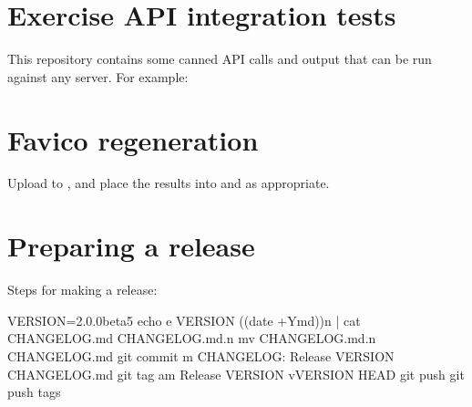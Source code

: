 \documentclass[letterpaper,10pt,english]{sphinxmanual}
\begin{document}
\section{Exercise API integration tests}
\label{\detokenize{advanced/development:exercise-api-integration-tests}}
\sphinxAtStartPar
This repository contains some canned API calls and output that can be run against
any server. For example:

\begin{sphinxVerbatim}[commandchars=\\\{\}]
  
\end{sphinxVerbatim}


\section{Favico regeneration}
\label{\detokenize{advanced/development:favico-regeneration}}
\sphinxAtStartPar
Upload  to , and place the results into
 and  as appropriate.


\section{Preparing a release}
\label{\detokenize{advanced/development:preparing-a-release}}
\sphinxAtStartPar
Steps for making a release:

\begin{sphinxVerbatim}[commandchars=\\\{\}]
VERSION=\PYGZdq{}2.0.0\PYGZhy{}beta5\PYGZdq{}
echo \PYGZhy{}e \PYGZdq{}\PYGZsh{}\PYGZsh{} \PYGZdl{}\PYGZob{}VERSION\PYGZcb{} (\PYGZdl{}(date +\PYGZsq{}\PYGZpc{}Y\PYGZhy{}\PYGZpc{}m\PYGZhy{}\PYGZpc{}d\PYGZsq{}))\PYGZbs{}n\PYGZdq{} | cat \PYGZhy{} CHANGELOG.md \PYGZgt{} CHANGELOG.md.n
mv CHANGELOG.md.n CHANGELOG.md
git commit \PYGZhy{}m \PYGZdq{}CHANGELOG: Release \PYGZdl{}\PYGZob{}VERSION\PYGZcb{}\PYGZdq{} CHANGELOG.md
git tag \PYGZhy{}am \PYGZdq{}Release \PYGZdl{}\PYGZob{}VERSION\PYGZcb{}\PYGZdq{} v\PYGZdl{}\PYGZob{}VERSION\PYGZcb{} HEAD
git push \PYGZam{}\PYGZam{} git push \PYGZhy{}\PYGZhy{}tags
\end{sphinxVerbatim}
\end{document}
